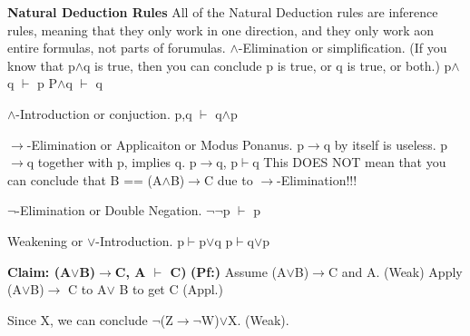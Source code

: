 \documentclass{article}
\begin{document}
\textbf{Natural Deduction Rules}\newline
All of the Natural Deduction rules are inference rules, meaning that they only work in one direction, and they only work aon entire formulas, not parts of forumulas.\newline\newline
$\wedge$-Elimination or simplification. \newline
(If you know that p$\wedge$q is true, then you can conclude p is true, or q is true, or both.) \newline
p$\wedge$q $\vdash$ p\newline
P$\wedge$q $\vdash$ q\newline\newline

$\wedge$-Introduction or conjuction. \newline
p,q $\vdash$ q$\wedge$p\newline\newline

$\rightarrow$-Elimination or Applicaiton or Modus Ponanus. \newline
p$\rightarrow$q by itself is useless. p$\rightarrow$q together with p, implies q.\newline
p$\rightarrow$q, p$\vdash$q\newline
This DOES NOT mean that you can conclude that B == (A$\wedge$B)$\rightarrow$C due to $\rightarrow$-Elimination!!!\newline\newline

$\neg$-Elimination or Double Negation.\newline
$\neg$$\neg$p $\vdash$ p\newline\newline

Weakening or $\lor$-Introduction.\newline
p$\vdash$p$\lor$q\newline
p$\vdash$q$\lor$p\newline\newline

\textbf{Claim: (A$\lor$B)$\rightarrow$C, A $\vdash$ C)}\newline
\textbf{(Pf:)}\newline
Assume (A$\lor$B)$\rightarrow$C and A. (Weak)\newline
Apply (A$\lor$B)$\rightarrow$ C to A$\lor$ B to get C (Appl.)\newline\newline

Since X, we can conclude $\neg$(Z$\rightarrow$$\neg$W)$\lor$X. (Weak). \newline\newline
\end{document}

